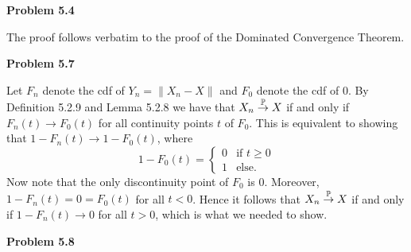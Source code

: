 \bigskip
\textbf{Problem 5.4}

The proof follows verbatim to the proof of the Dominated Convergence Theorem.

\bigskip
\textbf{Problem 5.7}

Let $F_n$ denote the cdf of $Y_n = \|X_n - X\|$ and $F_0$ denote the cdf of $0$. By Definition 5.2.9 and Lemma 5.2.8 we have that $X_n \stackrel{\mathbb P}{\rightarrow} X$ if and only if $F_n(t) \to F_0(t)$ for all continuity points $t$ of $F_0$. This is equivalent to showing that $1-F_n(t) \to 1-F_0(t)$, where
\[
	1-F_0(t) = \begin{cases}
		0 &\text{if } t \ge 0\\
		1 &\text{else.}
	\end{cases}
\] 
Now note that the only discontinuity point of $F_0$ is 0. Moreover, $1 - F_n(t) = 0 = F_0(t)$ for all $t < 0$. Hence it follows that $X_n \stackrel{\mathbb P}{\rightarrow} X$ if and only if $1 - F_n(t) \to 0$ for all $t > 0$, which is what we needed to show.

\bigskip
\textbf{Problem 5.8}

